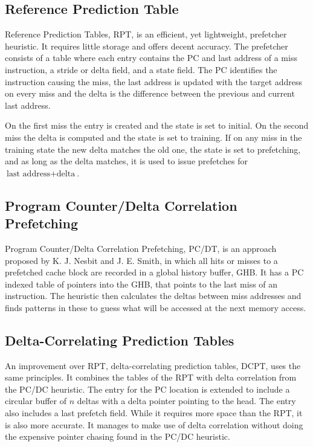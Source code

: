 \documentclass[journal,a4paper]{IEEEtran}
\begin{document}
\subsection{Reference Prediction Table}
Reference Prediction Tables, RPT, is an
efficient, yet lightweight, prefetcher heuristic. It requires little storage
and offers decent accuracy. The prefetcher consists of a table where each
entry contains the PC and last address of a miss instruction, a stride or
delta field, and a state field. The PC identifies the instruction causing
the miss, the last address is updated with the target address on every miss
and the delta is the difference between the previous and current last address.

On the first miss the entry is created and the state is set to initial. On
the second miss the delta is computed and the state is set to training. If
on any miss in the training state the new delta matches the old one, the
state is set to prefetching, and as long as the delta matches, it is used
to issue prefetches for $\textrm{last address} + \textrm{delta}$\cite{rpt}.

\subsection{Program Counter/Delta Correlation Prefetching}
Program Counter/Delta Correlation Prefetching, PC/DT, is an approach
proposed by K. J. Nesbit and J. E. Smith, in which all hits or misses
to a prefetched cache block are recorded in a global history buffer, GHB. It has
a PC indexed table of pointers into the GHB, that points to the last miss of an
instruction. The heuristic then calculates the deltas between miss addresses and
finds patterns in these to guess what will be accessed at the next memory access\cite{pcdc}.

\subsection{Delta-Correlating Prediction Tables}
An improvement over RPT, delta-correlating prediction tables, DCPT, uses the same principles.
It combines the tables of the RPT with delta correlation from the PC/DC heuristic.
The entry for the PC location is extended to include a circular buffer of $n$ deltas
with a delta pointer pointing to the head. The entry also includes a last prefetch field.
While it requires more space than the RPT, it is also more accurate. It manages to make
use of delta correlation without doing the expensive pointer chasing found in the PC/DC heuristic.
\end{document}
